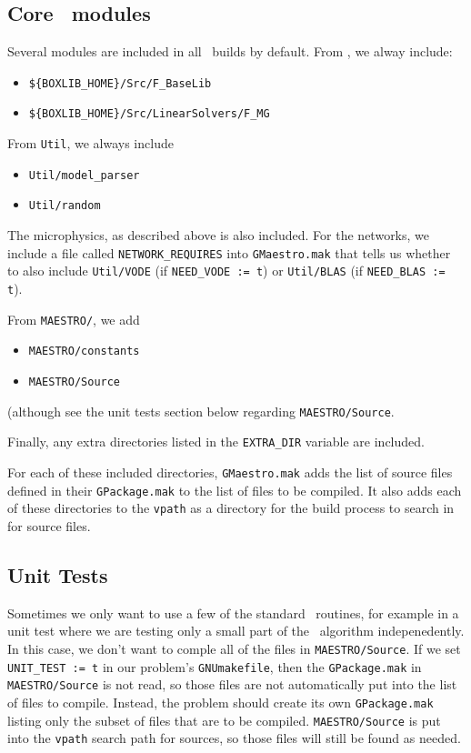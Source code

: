 \subsection{Core \maestro\ modules}

Several modules are included in all \maestro\ builds by default.
From \boxlib, we alway include:
\begin{itemize}
\item {\tt \$\{BOXLIB\_HOME\}/Src/F\_BaseLib}
\item {\tt \$\{BOXLIB\_HOME\}/Src/LinearSolvers/F\_MG}
\end{itemize}

\noindent From {\tt Util}, we always include
\begin{itemize}
\item {\tt Util/model\_parser}
\item {\tt Util/random}
\end{itemize}

The microphysics, as described above is also included.  For the networks,
we include a file called {\tt NETWORK\_REQUIRES} into {\tt GMaestro.mak}
that tells us whether to also include {\tt Util/VODE} (if {\tt NEED\_VODE := t})
or {\tt Util/BLAS} (if {\tt NEED\_BLAS := t}).


From {\tt MAESTRO/}, we add
\begin{itemize}
\item {\tt MAESTRO/constants}
\item {\tt MAESTRO/Source}
\end{itemize}
(although see the unit tests section below regarding {\tt MAESTRO/Source}.

\noindent Finally, any extra directories listed in the {\tt EXTRA\_DIR}
variable are included.

For each of these included directories, {\tt GMaestro.mak} adds the
list of source files defined in their {\tt GPackage.mak} to the list
of files to be compiled.  It also adds each of these directories to
the {\tt vpath} as a directory for the build process to search in for
source files.


\subsection{Unit Tests}

Sometimes we only want to use a few of the standard \maestro\
routines, for example in a unit test where we are testing only a small
part of the \maestro\ algorithm indepenedently.  In this case, we
don't want to comple all of the files in {\tt MAESTRO/Source}.  If we
set {\tt UNIT\_TEST := t} in our problem's {\tt GNUmakefile}, then the
{\tt GPackage.mak} in {\tt MAESTRO/Source} is not read, so those files
are not automatically put into the list of files to compile.  Instead,
the problem should create its own {\tt GPackage.mak} listing only the
subset of files that are to be compiled.  {\tt MAESTRO/Source} is put
into the {\tt vpath} search path for sources, so those files will
still be found as needed.



